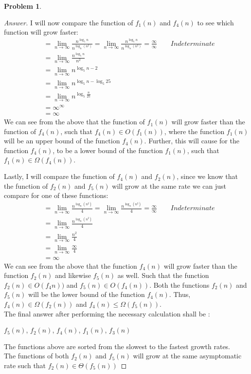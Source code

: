 \documentclass[11pt]{article}
\theoremstyle{definition}
\theoremstyle{definition}
\newtheorem{required}{Problem}
\theoremstyle{definition}
\begin{document}
\begin{required}
\begin{enumerate}[label=(\alph*)]
\begin{proof}[Answer]
I will now compare the function of $f_1(n)$ and  $f_4(n)$ to see which function will grow faster: \\
\begin{align*}
&= \lim_{n \to \infty} \frac{n^{\log_5 n}}{n^{\log_n(n^2)}} = \lim_{n \to \infty} \frac{n^{\log_5 n}}{n^{\log_n(n^2)}}  = \frac{\infty}{\infty} \qquad Indeterminate  \\
&= \lim_{n \to \infty} \frac{n^{\log_5 n}}{n^2} \\
&= \lim_{n \to \infty} n^{{\log_5 n}-{2}} \\
&= \lim_{n \to \infty} n^{{\log_5 n}-{\log_5 25}} \\
&= \lim_{n \to \infty} n^{\log_5 \frac{n}{25}}\\
&= \infty^{\infty}\\
&= \infty
\end{align*} 
We can see from the above that the function of $f_1(n)$ will grow faster than the function of $f_4(n)$, such that $f_4(n) \in O(f_1(n))$, where the function $f_1(n)$ will be an upper bound of the function $f_4(n)$. Further, this will cause for the function $f_4(n)$, to be a lower bound of the function $f_1(n)$, such that $f_1(n) \in \Omega(f_4(n))$.

Lastly, I will compare the function of $f_4(n)$ and $f_2(n)$, since we know that the function of $f_2(n)$ and $f_5(n)$ will grow at the same rate we can just compare for one of these functions:\\
\begin{align*}
&= \lim_{n \to \infty} \frac{n^{\log_n(n^2)}}{4} = \lim_{n \to \infty} \frac{n^{\log_n(n^2)}}{4} = \frac{\infty}{\infty} \qquad Indeterminate  \\
&= \lim_{n \to \infty} \frac{n^{\log_n(n^2)}}{4}  \\
&= \lim_{n \to \infty} \frac{n^{2}}{4}\\
&= \lim_{n \to \infty} \frac{\infty}{4} \\
&= \infty
\end{align*} 
We can see from the above that the function $f_4(n)$ will grow faster than the function $f_2(n)$ and likewise $f_5(n)$ as well. Such that the function $f_2(n) \in O(f_4n))$ and $f_5(n) \in O(f_4(n))$. Both the functions $f_2(n)$ and $f_5(n)$ will be the lower bound of the function $f_4(n)$. Thus, $f_4(n) \in \Omega(f_2(n))$ and $f_4(n) \leq \Omega(f_5(n))$. \\

The final answer after performing the necessary calculation shall be : \\
\begin{center}
$f_5(n)$, $f_2(n)$, $f_4(n)$, $f_1(n)$, $f_3(n)$
\end{center}
The functions above are sorted from the slowest to the fastest growth rates. \\
The functions of both $f_2(n)$ and $f_5(n)$ will grow at the same asymptomatic rate such that $f_2(n) \in \Theta(f_5(n))$
        \end{proof}
        \newpage


\end{enumerate}
\end{required}
\end{document}
